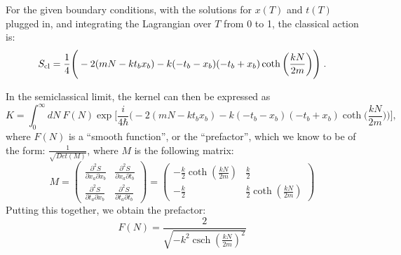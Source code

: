 \documentclass[12pt]{revtex4}
\DeclareMathOperator{\csch}{csch}
\begin{document}

For the given boundary conditions, with the solutions for $x(T)$ and $t(T)$ plugged in, and integrating the Lagrangian over $T$ from 0 to 1, the classical action  is:
\begin{equation*}
S_{\rm cl} = \frac{1}{4} \Bigg(-2 (m N - k t_b x_b) - k (-t_b - x_b) (-t_b + x_b) \coth\bigg(\frac{k N}{2 m}\bigg)\Bigg) \; .
\end{equation*} 

In the semiclassical limit, the kernel can then be expressed as 
\[ K=\int_{0}^{\infty} dN\ F(N) \exp \Bigg[\frac{i}{4 \hbar} \Bigg(-2 (m N - k t_b x_b) - k (-t_b - x_b) (-t_b + x_b) \coth\bigg(\frac{k N}{2 m}\bigg)\Bigg)\Bigg],\]
where $F(N)$ is a ``smooth function'', or the ``prefactor'', which we know to be of the form: $\frac{1}{\sqrt{Det(M)}}$, where $M$ is the following matrix:
\[ M=\begin{pmatrix}
\frac{\partial^2 S}{\partial x_a \partial x_b} & \frac{\partial^2 S}{\partial x_a \partial t_b} \\ 
\frac{\partial^2 S}{\partial t_a \partial x_b} & \frac{\partial^2 S}{\partial t_a \partial t_b} 
\end{pmatrix} = 
\begin{pmatrix}
-\frac{k}{2}  \coth(\frac{k N}{2 m}) & \frac{k}{2} \\ 
-\frac{k}{2} & \frac{k}{2} \coth(\frac{k N}{2 m})
\end{pmatrix} \]
Putting this together, we obtain the prefactor:
\[ F(N)=\frac{2}{\sqrt{-k^2 \csch(\frac{k N}{2 m})^2}} \]
\end{document}
